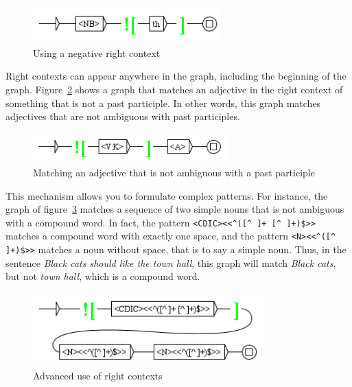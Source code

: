 \bigskip
\begin{figure}[!h]
\begin{center}
\includegraphics[width=7.3cm]{resources/img/fig6-13.png}
\caption{Using a negative right context\label{fig-context2}}
\end{center}
\end{figure}

\bigskip
\noindent Right contexts can appear anywhere in the graph, including the
beginning of the graph. Figure~\ref{fig-context3} shows a graph that matches an
adjective in the right context of something that is not a past participle. In other words, this
graph matches adjectives that are not ambiguous with past participles.

\bigskip
\begin{figure}[!h]
\begin{center}
\includegraphics[width=7.5cm]{resources/img/fig6-14.png}
\caption{Matching an adjective that is not ambiguous with a past
participle\label{fig-context3}}
\end{center}
\end{figure}

\bigskip
\noindent This mechanism allows you to formulate complex patterns. For
instance, the graph of figure~\ref{fig-context4} matches a sequence of two 
simple nouns that is not ambiguous with a compound word. In fact, the 
pattern \verb?<CDIC><<^([^ ]+ [^ ]+)$>>? 
matches a compound word with exactly one space, and the pattern 
\verb?<N><<^([^ ]+)$>>? matches a noun without space, that is to say a simple 
noun. Thus, in the sentence \textit{Black cats should like the town hall}, 
this graph will match \textit{Black cats}, but not \textit{town hall}, which is
a compound word.

\bigskip
\begin{figure}[!h]
\begin{center}
\includegraphics[width=8.9cm]{resources/img/fig6-15.png}
\caption{Advanced use of right contexts\label{fig-context4}}
\end{center}
\end{figure}

